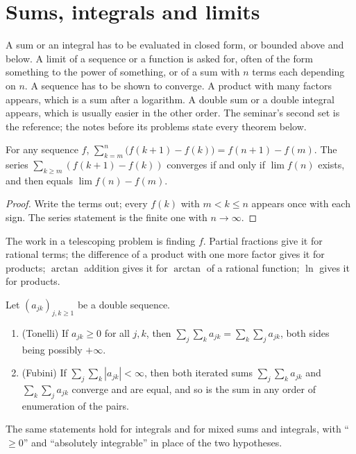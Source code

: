 \section{Sums, integrals and limits}

\begin{recognise}
A sum or an integral has to be evaluated in closed form, or bounded above and below. A limit of a sequence or a function is asked for, often of the form something to the power of something, or of a sum with $n$ terms each depending on $n$. A sequence has to be shown to converge. A product with many factors appears, which is a sum after a logarithm. A double sum or a double integral appears, which is usually easier in the other order. The seminar's second set is the reference; the notes before its problems state every theorem below.
\end{recognise}

\begin{lemma}[Telescoping]
For any sequence $f$, $\sum_{k=m}^{n}\bigl(f(k+1)-f(k)\bigr)=f(n+1)-f(m)$. The series $\sum_{k\ge m}(f(k+1)-f(k))$ converges if and only if $\lim f(n)$ exists, and then equals $\lim f(n)-f(m)$.
\end{lemma}

\begin{proof}
Write the terms out; every $f(k)$ with $m<k\le n$ appears once with each sign. The series statement is the finite one with $n\to\infty$.
\end{proof}

The work in a telescoping problem is finding $f$. Partial fractions give it for rational terms; the difference of a product with one more factor gives it for products; $\arctan$ addition gives it for $\arctan$ of a rational function; $\ln$ gives it for products.

\begin{theorem}
Let $(a_{jk})_{j,k\ge 1}$ be a double sequence.
\begin{enumerate}[nosep]
\item (Tonelli) If $a_{jk}\ge 0$ for all $j,k$, then $\sum_j\sum_k a_{jk}=\sum_k\sum_j a_{jk}$, both sides being possibly $+\infty$.
\item (Fubini) If $\sum_j\sum_k|a_{jk}|<\infty$, then both iterated sums $\sum_j\sum_k a_{jk}$ and $\sum_k\sum_j a_{jk}$ converge and are equal, and so is the sum in any order of enumeration of the pairs.
\end{enumerate}
The same statements hold for integrals and for mixed sums and integrals, with ``$\ge 0$'' and ``absolutely integrable'' in place of the two hypotheses.
\end{theorem}

